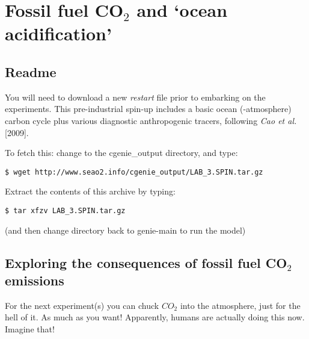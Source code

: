 \documentclass[11pt,fleqn]{book} %
\begin{document}
\chapter{Fossil fuel CO$_{2}$ and ‘ocean acidification’}

\hfill \break


\newpage


\section*{Readme}

You will need to download a new \textit{restart} file prior to embarking on the experiments. This pre-industrial spin-up includes a basic ocean (-atmosphere) carbon cycle plus various diagnostic anthropogenic tracers, following \textit{Cao et al.} [2009].

\vspace{1mm}
\noindent To fetch this: change to the \textsf{\footnotesize cgenie\_output} directory, and type:
\vspace{-2mm}
\begin{verbatim}
$ wget http://www.seao2.info/cgenie_output/LAB_3.SPIN.tar.gz
\end{verbatim}
\vspace{-2mm}

\noindent Extract the contents of this archive by typing:
\vspace{-2mm}
\begin{verbatim}
$ tar xfzv LAB_3.SPIN.tar.gz
\end{verbatim}
\vspace{-2mm}
\noindent (and then change directory back to \textsf{\footnotesize genie-main} to run the model)


\newpage


\section{Exploring the consequences of fossil fuel CO$_{2}$ emissions}

For the next experiment(s) you can chuck \(CO_{2}\) into the atmosphere, just for the hell of it. As much as you want! Apparently, humans are actually doing this now. Imagine that!
\end{document}
